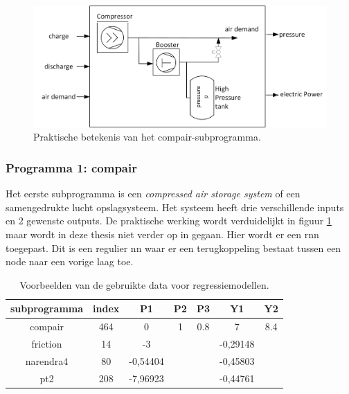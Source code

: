 		\begin{figure}
			\centering
			\includegraphics[width=120mm]{afbeeldingen/compairPraktijk.PNG}
			\caption[Praktische betekenis van het compair-subprogramma.]{Praktische betekenis van het compair-subprogramma\cite{bron:compair}.}
			\label{fig:compairPraktijk}
		\end{figure}
		
		\newpage
		
		\subsubsection{Programma 1: compair}
		Het eerste subprogramma is een \textit{compressed air storage system} of een samengedrukte lucht opslagsysteem. Het systeem heeft drie verschillende inputs en 2 gewenste outputs. De praktische werking wordt verduidelijkt in figuur \ref{fig:compairPraktijk} maar wordt in deze thesis niet verder op in gegaan. Hier wordt er een \gls{rnn} toegepast. Dit is een regulier \gls{nn} waar er een terugkoppeling bestaat tussen een node naar een vorige laag toe. 
			

	
		\begin{table}
			\centering
			\begin{tabular}{ccccccc}
				\hline
				subprogramma                   & index & P1       & P2 & P3  & Y1       & Y2  \\ \hline
				\multicolumn{1}{c|}{compair}   & 464   & 0        & 1  & 0.8 & 7        & 8.4 \\
				\multicolumn{1}{c|}{friction}  & 14    & -3       &    &     & -0,29148 &     \\
				\multicolumn{1}{c|}{narendra4} & 80    & -0,54404 &    &     & -0,45803 &     \\
				\multicolumn{1}{c|}{pt2}       & 208   & -7,96923 &    &     & -0,44761 &     \\ \hline
			\end{tabular}
			\caption{Voorbeelden van de gebruikte data voor regressiemodellen.}
			\label{tab:dataVoorbeelden}
		\end{table}
	

